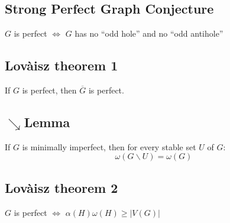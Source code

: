         \subsection{Strong Perfect Graph Conjecture}
            $G$ is perfect $\Leftrightarrow$ $G$ has no ``odd hole'' and no ``odd antihole''
        \subsection{Lovàisz theorem 1}
            If $G$ is perfect, then $\overline{G}$ is perfect.
        \subsection{$\searrow$Lemma}
            If $G$ is minimally imperfect, then for every stable set $U$ of $G$:
            \[
                \omega(G\backslash U)=\omega(G)
            \]
        \subsection{Lovàisz theorem 2}
            $G$ is perfect $\Leftrightarrow$ $\alpha(H)\omega(H)\geq|V(G)|$
